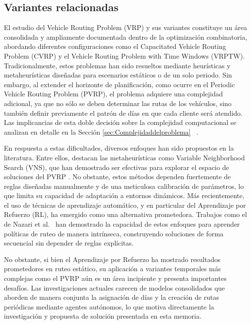 \subsection{Variantes relacionadas} \label{sec:Variantesrelacionadas}

El estudio del Vehicle Routing Problem (VRP) y sus variantes constituye un área consolidada y ampliamente documentada dentro de la optimización combinatoria, abordando diferentes configuraciones como el Capacitated Vehicle Routing Problem (CVRP) y el Vehicle Routing Problem with Time Windows (VRPTW)\cite{Casas}. Tradicionalmente, estos problemas han sido resueltos mediante heurísticas y metaheurísticas diseñadas para escenarios estáticos o de un solo periodo. Sin embargo, al extender el horizonte de planificación, como ocurre en el Periodic Vehicle Routing Problem (PVRP), el problema adquiere una complejidad adicional, ya que no sólo se deben determinar las rutas de los vehículos, sino también definir previamente el patrón de días en que cada cliente será atendido. Las implicancias de esta doble decisión sobre la complejidad computacional se analizan en detalle en la Sección \ref{sec:Complejidaddelproblema} ~\cite{EKSIOGLU20091472, inbook, HEMMELMAYR2009791}.

En respuesta a estas dificultades, diversos enfoques han sido propuestos en la literatura. Entre ellos, destacan las metaheurísticas como Variable Neighborhood Search (VNS), que han demostrado ser efectivas para explorar el espacio de soluciones del PVRP \cite{HEMMELMAYR2009791}. No obstante, estos métodos dependen fuertemente de reglas diseñadas manualmente y de una meticulosa calibración de parámetros, lo que limita su capacidad de adaptación a entornos dinámicos. Más recientemente, el uso de técnicas de aprendizaje automático, y en particular del Aprendizaje por Refuerzo (RL), ha emergido como una alternativa prometedora. Trabajos como el de Nazari et al.~\cite{nazari2018reinforcementlearningsolvingvehicle} han demostrado la capacidad de estos enfoques para aprender políticas de ruteo de manera intrínseca, construyendo soluciones de forma secuencial sin depender de reglas explícitas.

No obstante, si bien el Aprendizaje por Refuerzo ha mostrado resultados prometedores en ruteo estático, su aplicación a variantes temporales más complejas como el PVRP aún es un área incipiente y presenta importantes desafíos. Las investigaciones actuales carecen de modelos consolidados que aborden de manera conjunta la asignación de días y la creación de rutas periódicas mediante agentes autónomos, lo que motiva directamente la investigación y propuesta de solución presentada en esta memoria.

